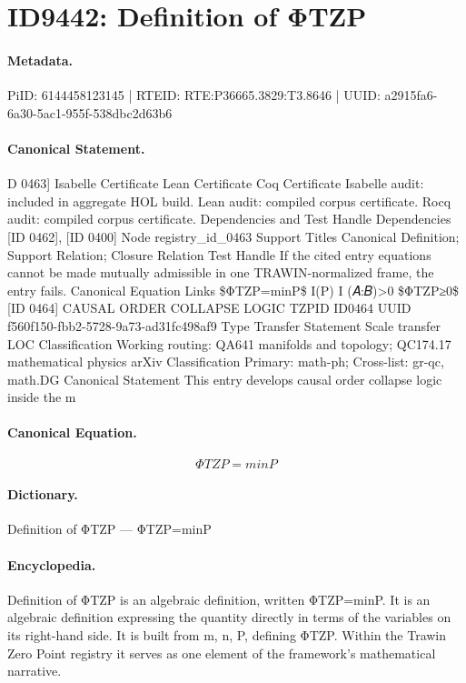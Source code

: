 \section*{ID9442: Definition of ΦTZP}
\paragraph{Metadata.}
PiID: 6144458123145 | RTEID: RTE:P36665.3829:T3.8646 | UUID: a2915fa6-6a30-5ac1-955f-538dbc2d63b6

\paragraph{Canonical Statement.}
D 0463] Isabelle Certificate Lean Certificate Coq Certificate Isabelle audit: included in aggregate HOL build. Lean audit: compiled corpus certificate. Rocq audit: compiled corpus certificate. Dependencies and Test Handle Dependencies [ID 0462], [ID 0400] Node registry\_id\_0463 Support Titles Canonical Definition; Support Relation; Closure Relation Test Handle If the cited entry equations cannot be made mutually admissible in one TRAWIN-normalized frame, the entry fails. Canonical Equation Links \$ΦTZP=minP\$ I(P) I (𝐴:𝐵)>0 \$ΦTZP≥0\$ [ID 0464] CAUSAL ORDER COLLAPSE LOGIC TZPID ID0464 UUID f560f150-fbb2-5728-9a73-ad31fc498af9 Type Transfer Statement Scale transfer LOC Classification Working routing: QA641 manifolds and topology; QC174.17 mathematical physics arXiv Classification Primary: math-ph; Cross-list: gr-qc, math.DG Canonical Statement This entry develops causal order collapse logic inside the m

\paragraph{Canonical Equation.}
\[
ΦTZP=minP
\]

\paragraph{Dictionary.}
Definition of ΦTZP — ΦTZP=minP

\paragraph{Encyclopedia.}
Definition of ΦTZP is an algebraic definition, written ΦTZP=minP. It is an algebraic definition expressing the quantity directly in terms of the variables on its right-hand side. It is built from m, n, P, defining ΦTZP. Within the Trawin Zero Point registry it serves as one element of the framework's mathematical narrative.
